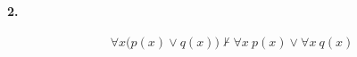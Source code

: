 \documentclass[]{exam}
\begin{document}
\paragraph[2.1]{2.}

$$\forall x\biggl( p(x) \lor q(x) \biggr) \not \vdash \forall x \: p(x) \lor \forall x  \: q(x)$$
\end{document}
